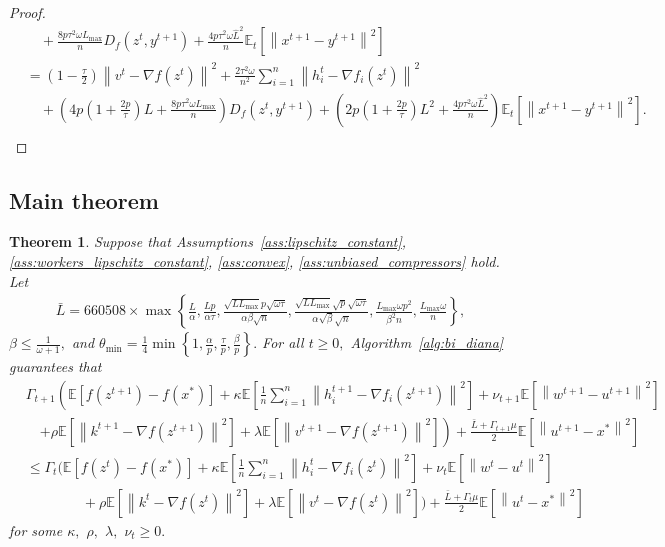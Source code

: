 \documentclass{article} %
\newcommand{\norm}[1]{\left\| #1 \right\|}
\newcommand{\Exp}[1]{{\mathbb{E}}\left[#1\right]}
\newcommand{\ExpSub}[2]{{\mathbb{E}}_{#1}\left[#2\right]}
\theoremstyle{plain}
\newtheorem{theorem}{Theorem}[section]
\theoremstyle{definition}
\theoremstyle{remark}
\begin{document}
\begin{proof}
\begin{align*}
  &\quad + \frac{8 p \tau^2 \omega L_{\max}}{n} D_f(z^t, y^{t+1}) + \frac{4 p \tau^2 \omega \widehat{L}^2}{n} \ExpSub{t}{\norm{x^{t+1} - y^{t+1}}^2} \\
  &= \left(1 - \frac{\tau}{2}\right) \norm{v^{t} - \nabla f(z^{t})}^2 + \frac{2 \tau^2 \omega}{n^2} \sum_{i=1}^n \norm{h^t_i - \nabla f_i(z^{t})}^2 \\
  &\quad + \left(4 p \left(1 + \frac{2 p}{\tau}\right) L + \frac{8 p \tau^2 \omega L_{\max}}{n}\right)D_f(z^t, y^{t+1}) + \left(2 p \left(1 + \frac{2 p}{\tau}\right) L^2 + \frac{4 p \tau^2 \omega \widehat{L}^2}{n}\right)\ExpSub{t}{\norm{x^{t+1} - y^{t+1}}^2}. \\
\end{align*}
\end{proof}

\subsection{Main theorem}
\newcommand{\liptconstraintconst}{660508}
\newcommand{\liptconstraint}{\bar{L} = \liptconstraintconst \times \max\left\{\frac{L}{\alpha}, \frac{L p}{\alpha \tau}, \frac{\sqrt{L L_{\max}} p \sqrt{\omega \tau}}{\alpha \beta \sqrt{n}}, \frac{\sqrt{L L_{\max}} \sqrt{p} \sqrt{\omega \tau}}{\alpha \sqrt{\beta} \sqrt{n}}, \frac{L_{\max} \omega p^2}{\beta^2 n}, \frac{L_{\max} \omega}{n}\right\}}
\begin{theorem}
  \label{theorem:main_theorem}
  Suppose that Assumptions~\ref{ass:lipschitz_constant}, \ref{ass:workers_lipschitz_constant}, \ref{ass:convex}, \ref{ass:unbiased_compressors} hold. Let
\begin{align}
  \label{eq:constr_lipts}
  \liptconstraint,
\end{align}
$\beta \leq \frac{1}{\omega + 1},$ and $\theta_{\min} = \frac{1}{4}\min\left\{1, \frac{\alpha}{p}, \frac{\tau}{p}, \frac{\beta}{p}\right\}.$
For all $t \geq 0,$ Algorithm~\ref{alg:bi_diana} guarantees that
\begin{equation}
\begin{aligned}
  \label{eq:main_theorem}
  &\Gamma_{t+1}\left(\Exp{f(z^{t+1}) - f(x^*)} + \kappa \Exp{\frac{1}{n}\sum_{i=1}^n \norm{h_i^{t+1} - \nabla f_i(z^{t+1})}^2} + \nu_{t+1} \Exp{\norm{w^{t+1} - u^{t+1}}^2}\right.\\
    &\quad  \left.+ \rho \Exp{\norm{k^{t+1} - \nabla f(z^{t+1})}^2} + \lambda \Exp{\norm{v^{t+1} - \nabla f(z^{t+1})}^2}\right) + \frac{\bar{L} + \Gamma_{t+1} \mu}{2} \Exp{\norm{u^{t+1} - x^*}^2}\\
    &\leq \Gamma_{t} \Bigg( \Exp{f(z^{t}) - f(x^*)} + \kappa \Exp{\frac{1}{n}\sum_{i=1}^n \norm{h_i^t - \nabla f_i(z^{t})}^2}  + \nu_{t} \Exp{\norm{w^t - u^t}^2} \\
    &\qquad\qquad + \rho \Exp{\norm{k^{t} - \nabla f(z^t)}^2} + \lambda \Exp{\norm{v^{t} - \nabla f(z^t)}^2} \Bigg) + \frac{\bar{L} + \Gamma_{t} \mu}{2} \Exp{\norm{u^t - x^*}^2}
\end{aligned}
\end{equation}
for some $\kappa,$ $\rho,$ $\lambda,$ $\nu_{t} \geq 0.$
\end{theorem}
\end{document}
